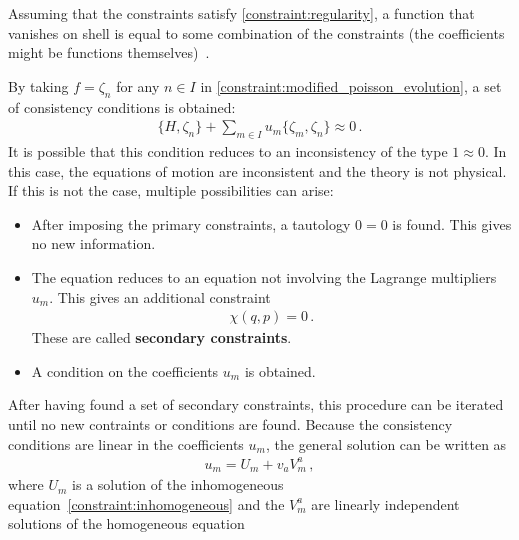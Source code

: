     \begin{property}\label{constraint:weakly_vanishing_functions}
        Assuming that the constraints satisfy \cref{constraint:regularity}, a function that vanishes on shell is equal to some combination of the constraints (the coefficients might be functions themselves)~\citep[p.~70]{henneaux_quantization_1992}.
    \end{property}

    \begin{property}
        By taking $f=\zeta_n$ for any $n\in I$ in \cref{constraint:modified_poisson_evolution}, a set of consistency conditions is obtained:
        \begin{gather}
            \label{constraint:inhomogeneous}
            \{H,\zeta_n\} + \sum_{m\in I}u_m\{\zeta_m,\zeta_n\}\approx 0\,.
        \end{gather}
        It is possible that this condition reduces to an inconsistency of the type $1\approx0$. In this case, the equations of motion are inconsistent and the theory is not physical. If this is not the case, multiple possibilities can arise:
        \begin{itemize}
            \item After imposing the primary constraints, a tautology $0=0$ is found. This gives no new information.
            \item The equation reduces to an equation not involving the Lagrange multipliers $u_m$. This gives an additional constraint
                \begin{gather}
                    \chi(q,p)=0\,.
                \end{gather}
                These are called \textbf{secondary constraints}.
            \item A condition on the coefficients $u_m$ is obtained.
        \end{itemize}
        After having found a set of secondary constraints, this procedure can be iterated until no new contraints or conditions are found. Because the consistency conditions are linear in the coefficients $u_m$, the general solution can be written as
        \begin{gather}
            u_m = U_m + v_aV^a _m\,,
        \end{gather}
        where $U_m$ is a solution of the inhomogeneous equation~\eqref{constraint:inhomogeneous} and the $V^a_m$ are linearly independent solutions of the homogeneous equation
        \begin{gather}

\end{gather}
\end{property}
